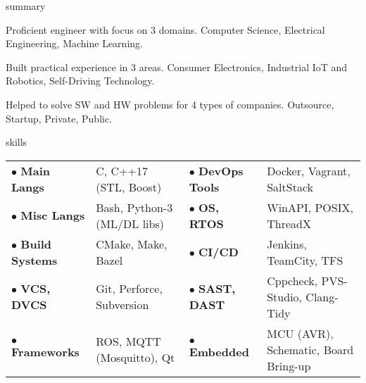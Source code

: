 \documentclass{Vladimir.Ivanov.CV}
\begin{document}
\begin{rSection}{summary}
\begin{rItemize}

\item Proficient engineer with focus on 3 domains. Computer Science, Electrical Engineering, Machine Learning.
\item Built practical experience in 3 areas. Consumer Electronics, Industrial IoT and Robotics, Self-Driving Technology.
\item Helped to solve SW and HW problems for 4 types of companies. Outsource, Startup, Private, Public.

\end{rItemize}
\end{rSection}

\begin{rSection}{skills}
\begin{tabular}{llll}

$\bullet$ \textbf{Main Langs}    & C, C++17 (STL, Boost)       & $\bullet$ \textbf{DevOps Tools} & Docker, Vagrant, SaltStack \\
$\bullet$ \textbf{Misc Langs}    & Bash, Python-3 (ML/DL libs) & $\bullet$ \textbf{OS, RTOS}     & WinAPI, POSIX, ThreadX \\
$\bullet$ \textbf{Build Systems} & CMake, Make, Bazel          & $\bullet$ \textbf{CI/CD}        & Jenkins, TeamCity, TFS \\
$\bullet$ \textbf{VCS, DVCS}     & Git, Perforce, Subversion   & $\bullet$ \textbf{SAST, DAST}   & Cppcheck, PVS-Studio, Clang-Tidy \\
$\bullet$ \textbf{Frameworks}    & ROS, MQTT (Mosquitto), Qt   & $\bullet$ \textbf{Embedded}     & MCU (AVR), Schematic, Board Bring-up

\end{tabular}
\end{rSection}
\end{document}
